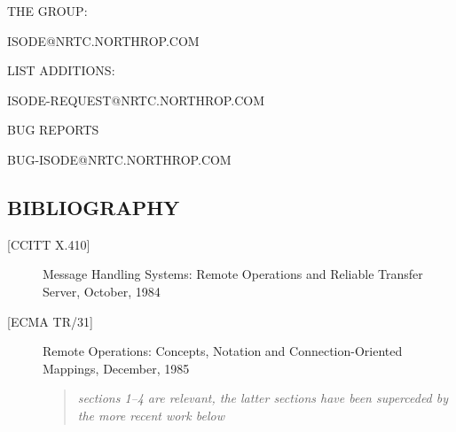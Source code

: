 \begin{bwslide}

\begin{nrtc}
\item	THE GROUP:
    \begin{nrtc}
    \item	ISODE@NRTC.NORTHROP.COM
    \end{nrtc}

\item	LIST ADDITIONS:
    \begin{nrtc}
    \item	ISODE-REQUEST@NRTC.NORTHROP.COM
    \end{nrtc}

\item	BUG REPORTS
    \begin{nrtc}
    \item	BUG-ISODE@NRTC.NORTHROP.COM
    \end{nrtc}
\end{nrtc}
\end{bwslide}


\begin{bwslide}
\part*	{BIBLIOGRAPHY}%

\begin{description}
\item[{[CCITT X.410]}]	Message Handling Systems: Remote Operations
			and Reliable Transfer Server, October, 1984

\item[{[ECMA TR/31]}]	Remote Operations: Concepts, Notation and
			Connection-Oriented Mappings, December, 1985
    \begin{quote}\em
    sections 1--4 are relevant, the latter sections have been superceded by
    the more recent work below
    \end{quote}
\end{description}
\end{bwslide}


